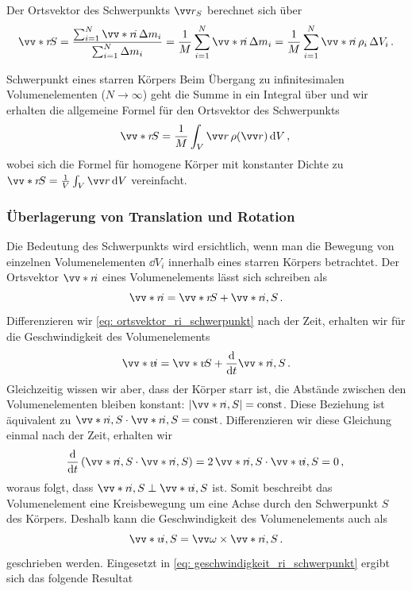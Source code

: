 Der Ortsvektor des Schwerpunkts $\ivec{r}_S$ berechnet sich über 
\begin{equation}
    \ivecS{r}{S} = \frac{\sum_{i=1}^{N} \ivecS{r}{i} \, \Delta m_i}{\sum_{i=1}^{N} \Delta m_i} = \frac{1}{M} \sum_{i=1}^{N} \ivecS{r}{i} \, \Delta m_i = \frac{1}{M} \sum_{i=1}^{N} \ivecS{r}{i} \, \rho_i \, \Delta V_i \mDot
\end{equation}
\begin{importantbox}{Schwerpunkt eines starren Körpers}
    Beim Übergang zu infinitesimalen Volumenelementen ($N \to \infty$) geht die Summe in ein Integral über und wir erhalten die allgemeine Formel für den Ortsvektor des Schwerpunkts
    \begin{equation}\label{eq: schwerpunkt_starrer_koerp_allg}
        \ivecS{r}{S} = \frac{1}{M} \int_V \ivec{r} \, \rho(\ivec{r}) \, \dd V \mComma
    \end{equation}
    wobei sich die Formel für homogene Körper mit konstanter Dichte zu $\ivecS{r}{S} = \frac{1}{V} \int_V \ivec{r} \, \dd V$ vereinfacht. 
\end{importantbox}

\subsubsection{Überlagerung von Translation und Rotation}\label{subsubsec: ueberlagerung_schwerpunktsbew_rotation}
Die Bedeutung des Schwerpunkts wird ersichtlich, wenn man die Bewegung von einzelnen Volumenelementen $\dd V_i$ innerhalb eines starren Körpers betrachtet. Der Ortsvektor $\ivecS{r}{i}$ eines Volumenelements lässt sich schreiben als 
\begin{equation}\label{eq: ortsvektor_ri_schwerpunkt}
    \ivecS{r}{i} = \ivecS{r}{S} + \ivecS{r}{i,S} \mDot
\end{equation}
Differenzieren wir \cref{eq: ortsvektor_ri_schwerpunkt} nach der Zeit, erhalten wir für die Geschwindigkeit des Volumenelements
\begin{equation}\label{eq: geschwindigkeit_ri_schwerpunkt}
    \ivecS{v}{i} = \ivecS{v}{S} + \frac{\dd}{\dd t}\ivecS{r}{i,S} \mDot
\end{equation}
Gleichzeitig wissen wir aber, dass der Körper starr ist, \gDh die Abstände zwischen den Volumenelementen bleiben konstant: $| \ivecS{r}{i,S} | = \const$. Diese Beziehung ist äquivalent zu $\ivecS{r}{i,S} \cdot \ivecS{r}{i,S} = \const$. Differenzieren wir diese Gleichung einmal nach der Zeit, erhalten wir
\begin{equation}
    \frac{\dd}{\dd t} \left( \ivecS{r}{i,S} \cdot \ivecS{r}{i,S} \right) = 2 \, \ivecS{r}{i,S} \cdot \ivecS{v}{i,S} = 0 \mComma
\end{equation}
woraus folgt, dass $\ivecS{r}{i,S} \perp \ivecS{v}{i,S}$ ist. Somit beschreibt das Volumenelement eine Kreisbewegung um eine Achse durch den Schwerpunkt $S$ des Körpers. Deshalb kann die Geschwindigkeit des Volumenelements auch als 
\begin{equation}\label{eq: geschwindigkeit_ri_schwerpunkt_rotation}
    \ivecS{v}{i,S} = \ivec{\omega} \times \ivecS{r}{i,S} \mDot
\end{equation}
geschrieben werden. Eingesetzt in \cref{eq: geschwindigkeit_ri_schwerpunkt} ergibt sich das folgende Resultat

